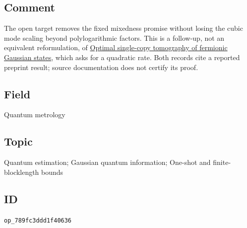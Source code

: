 \subsection*{Comment}

The open target removes the fixed mixedness promise without losing the cubic mode scaling beyond polylogarithmic factors. This is a follow-up, not an equivalent reformulation, of \href{https://qiqc-op.com/problem/op_91c81ca77b99eebf/}{Optimal single-copy tomography of fermionic Gaussian states}, which asks for a quadratic rate. Both records cite a reported preprint result; source documentation does not certify its proof.

\subsection*{Field}

Quantum metrology

\subsection*{Topic}

Quantum estimation; Gaussian quantum information; One-shot and finite-blocklength bounds

\subsection*{ID}

\texttt{op\_789fc3ddd1f40636}
